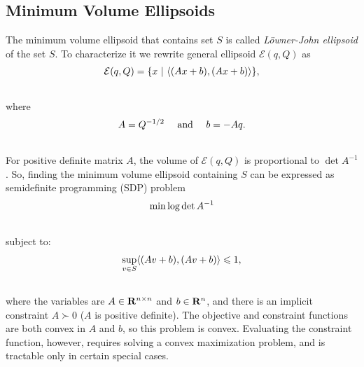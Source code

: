 \documentclass[letterpaper,10pt,english]{sphinxmanual}
\begin{document}
\subsection{Minimum Volume Ellipsoids}
\label{main_source:minimum-volume-ellipsoids}
The minimum volume ellipsoid that contains set $S$ is called
\emph{Löwner-John ellipsoid} of the set $S$. To characterize it we
rewrite general ellipsoid ${\mathcal E}(q,Q)$ as
\begin{gather}
\begin{split}{\mathcal E}(q,Q) = \{x ~|~ \langle (Ax + b), (Ax + b)\rangle \},\end{split}\notag\\\begin{split}\end{split}\notag
\end{gather}
where
\begin{gather}
\begin{split}A = Q^{-1/2} ~~~ \mbox{ and } ~~~ b = -Aq .\end{split}\notag\\\begin{split}\end{split}\notag
\end{gather}
For positive definite matrix $A$, the volume of
${\mathcal E}(q,Q)$ is proportional to $\det A^{-1}$. So,
finding the minimum volume ellipsoid containing $S$ can be
expressed as semidefinite programming (SDP) problem
\begin{gather}
\begin{split}\min \log \det A^{-1}\end{split}\notag\\\begin{split}\end{split}\notag
\end{gather}
subject to:
\begin{gather}
\begin{split}\sup_{v\in S} \langle (Av + b), (Av + b)\rangle \leqslant1,\end{split}\notag\\\begin{split}\end{split}\notag
\end{gather}
where the variables are $A\in{\bf R}^{n\times n}$ and
$b\in{\bf R}^n$, and there is an implicit constraint
$A\succ 0$ ($A$ is positive definite). The objective and
constraint functions are both convex in $A$ and $b$, so this
problem is convex. Evaluating the constraint function, however, requires
solving a convex maximization problem, and is tractable only in certain
special cases.
\end{document}
